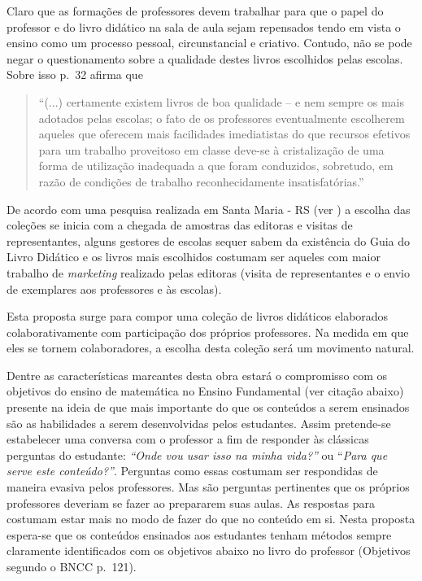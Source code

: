 \documentclass[10 pt]{article}
\begin{document}
 Claro que as formações de professores devem trabalhar para que o papel do professor e do livro didático na sala de aula sejam repensados tendo em vista o ensino como um processo pessoal, circunstancial e criativo.
 Contudo, não se pode negar o questionamento sobre a qualidade destes livros escolhidos pelas escolas.
 Sobre isso \cite{machado} p.~32 afirma que
 \blockquote{``(...) certamente existem livros de boa qualidade -- e nem sempre os mais adotados pelas escolas;
 o fato de os professores eventualmente escolherem aqueles que oferecem mais facilidades imediatistas do que recursos efetivos para um trabalho proveitoso em classe deve-se à cristalização de uma forma de utilização inadequada a que foram conduzidos, sobretudo, em razão de condições de trabalho reconhecidamente insatisfatórias.''}

De acordo com uma pesquisa realizada em Santa Maria - RS (ver \cite{zambon}) a escolha das coleções se inicia com a chegada de amostras das editoras e visitas de representantes, alguns gestores de escolas sequer sabem da existência do Guia do Livro Didático e os livros mais escolhidos costumam ser aqueles com maior trabalho de {\it marketing} realizado pelas editoras (visita de representantes e o envio de exemplares aos professores e às escolas).

Esta proposta surge para compor uma coleção de livros didáticos elaborados colaborativamente com participação dos próprios professores.
Na medida em que eles se tornem colaboradores, a escolha desta coleção será um movimento natural.

Dentre as características marcantes desta obra estará o compromisso com os objetivos do ensino de matemática no Ensino Fundamental (ver citação abaixo) presente na ideia de que mais importante do que os conteúdos a serem ensinados são as habilidades a serem desenvolvidas pelos estudantes.
Assim pretende-se estabelecer uma conversa com o professor a fim de responder às clássicas perguntas do estudante: {\it ``Onde vou usar isso na minha vida?''} ou {``\it Para que serve este conteúdo?''}.
Perguntas como essas costumam ser respondidas de maneira evasiva pelos professores.
Mas são perguntas pertinentes que os próprios professores deveriam se fazer ao prepararem suas aulas.
As respostas para costumam estar mais no modo de fazer do que no conteúdo em si.
Nesta proposta espera-se que os conteúdos ensinados aos estudantes tenham métodos sempre claramente identificados com os objetivos abaixo no livro do professor (Objetivos segundo o BNCC \cite{bncc} p.~121).
\end{document}
